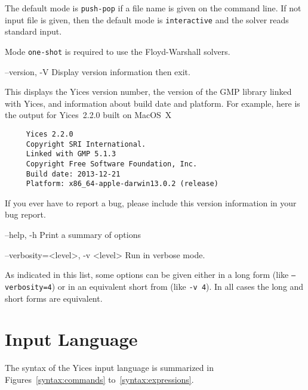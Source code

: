 \documentclass[11pt,twoside,fleqn,openright,titlepage]{cslreport}
\newenvironment{options}{
\begin{list}{}{
\setlength{\labelsep}{1.8ex}
\setlength{\labelwidth}{0pt}
\setlength{\itemindent}{-0.5\leftmargin}
\settowidth{\leftmargin}{\texttt{--}}
\renewcommand{\makelabel}{\optionlabel}}}
{\end{list}}
\newcommand*\optionlabel[1]{\hspace\labelsep\texttt{#1}}
\begin{document}
\begin{options}
  The default mode is \texttt{push-pop} if a file name is given on the
  command line. If  not input file is given, then  the default mode is
  \texttt{interactive} and the solver reads standard input.

  Mode \texttt{one-shot} is required to use the Floyd-Warshall solvers.

\item[--version, -V] Display version information then exit.

  This  displays the  Yices version  number,  the version  of the  GMP
  library  linked with  Yices, and  information about  build date  and
  platform. For example,  here is the output for  Yices~2.2.0 built on
  MacOS~X
  \begin{small}
  \begin{verbatim}
     Yices 2.2.0
     Copyright SRI International.
     Linked with GMP 5.1.3
     Copyright Free Software Foundation, Inc.
     Build date: 2013-12-21
     Platform: x86_64-apple-darwin13.0.2 (release)
  \end{verbatim}
  \end{small}
  \vspace*{-1em}
  If you ever have to report a bug, please include this version information
  in your bug report.

\item[--help, -h] Print a summary of options

\item[--verbosity=<level>, -v <level>] Run in verbose mode.
\end{options}
As indicated in this list, some options can be given either in a long
form (like \texttt{--verbosity=4}) or in an equivalent short from (like
\texttt{-v 4}). In all cases the long and short forms are equivalent.

\section{Input Language}

The   syntax  of   the   Yices  input   language   is  summarized   in
Figures~\ref{syntax:commands} to~\ref{syntax:expressions}.
\end{document}
